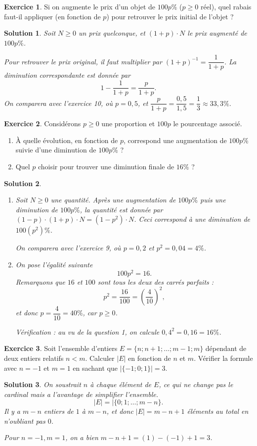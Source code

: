 \documentclass[a4paper, 14pt]{extarticle}
\theoremstyle{plain}
\newtheorem*{sol}{Solution}
\theoremstyle{definition}
\newtheorem{ex}{Exercice}
\newcommand{\exe}[2]{
		\begin{ex} #1  \end{ex}
		\begin{sol} #2 \end{sol}
	}
\newcommand{\exe}[2]{
		\begin{ex} #1  \end{ex}
	}
\begin{document}
\exe{
  Si on augmente le prix d'un objet de $100p\%$ ($p\geq0$ réel), quel rabais faut-il appliquer (en fonction de $p$) pour retrouver le prix initial de l'objet ?
}{
	Soit $N\geq0$ un prix quelconque, et $(1+p)\cdot N$ le prix augmenté de $100p\%$.
	
	Pour retrouver le prix original, il faut multiplier par $(1+p)^{-1} = \dfrac{1}{1+p}$.
	La diminution correspondante est donnée par
		\[ 1 - \dfrac{1}{1+p} = \dfrac{p}{1+p}. \]
	On comparera avec l'exercice 10, où $p=0,5$, et $\dfrac{p}{1+p} = \dfrac{0,5}{1,5} = \dfrac13 \approx 33,3 \%$.
}

\exe{
    Considérons $p\geq 0$ une proportion et $100p$ le pourcentage associé.
    \begin{enumerate}
    \item À quelle évolution, en fonction de $p$, correspond une augmentation de $100p\%$ suivie d'une diminution de $100p\%$ ?
    \item Quel $p$ choisir pour trouver une diminution finale de $16\%$ ?
    \end{enumerate}
}{

    \begin{enumerate}
    \item Soit $N\geq0$ une quantité. Après une augmentation de $100p\%$ puis une diminution de $100p\%$,
    		la quantité est donnée par $(1-p) \cdot (1+p) \cdot N = (1-p^2) \cdot N$.
    		Ceci correspond à une diminution de $100\left(p^2\right) \%$.
    		
    		On comparera avec l'exercice 9, où $p=0,2$ et $p^2 = 0,04 = 4\%$.
    \item On pose l'égalité suivante
    		\[ 100p^2 = 16. \]
    	Remarquons que $16$ et $100$ sont tous les deux des carrés parfaits :
    		\[ p^2 = \dfrac{16}{100} = \left( \dfrac{4}{10} \right)^2, \]
	et donc $p = \dfrac{4}{10} = 40\%$, car $p\geq 0$.
	
	Vérification : au vu de la question 1, on calcule $0,4^2 = 0,16 = 16\%$.
    \end{enumerate}

}

\exe{
    Soit l'ensemble d'entiers $E=\{n; n+1; \dots; m-1 ; m\}$ dépendant de deux entiers relatifs $n<m$.
    Calculer $|E|$ en fonction de $n$ et $m$.
    Vérifier la formule avec $n=-1$ et $m=1$ en sachant que $|\{-1 ; 0 ; 1 \}| = 3$.
}{
	On soustrait $n$ à chaque élément de $E$, ce qui ne change pas le cardinal mais a l'avantage de simplifier l'ensemble.
		\[ |E| = |\{ 0; 1 ; \dots ; m-n \}. \]
	Il y a $m-n$ entiers de $1$ à $m-n$, et donc $|E| = m-n+1$ éléments au total en n'oubliant pas $0$.

	Pour $n=-1, m=1$, on a bien $m-n+1 = (1) - (-1) + 1  = 3$.
}
\end{document}
